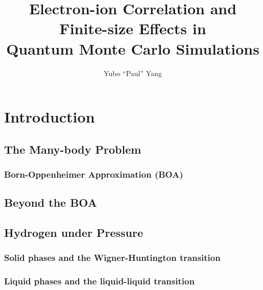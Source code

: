 \documentclass[draftthesis,fullpage]{uiucthesis}
\begin{document}
\title{Electron-ion Correlation and Finite-size Effects in\\
       Quantum Monte Carlo Simulations}
\author{Yubo ``Paul'' Yang}
\phdthesis
{}

%
%
\mainmatter

\chapter{Introduction}
\section{The Many-body Problem}
\subsection{Born-Oppenheimer Approximation (BOA)}
\section{Beyond the BOA}
\section{Hydrogen under Pressure}
\subsection{Solid phases and the Wigner-Huntington transition}
\subsection{Liquid phases and the liquid-liquid transition}
\end{document}
